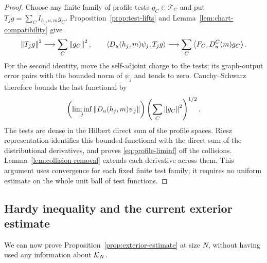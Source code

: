 \begin{proof}
Choose any finite family of profile tests \(g_C\in\mathcal T_C\) and put
\(T_jg=\sum_C I_{h_j,u,m}g_C\). Proposition~\ref{prop:test-lifts} and
Lemma~\ref{lem:chart-compatibility} give
\[
 \left\lVert T_jg\right\rVert^2\longrightarrow\sum_C\left\lVert g_C\right\rVert^2,
 \qquad
 \left\langle D_u(h_j,m)\psi_j,T_jg\right\rangle
 \longrightarrow\sum_C\left\langle F_C,D_u^C(m)g_C\right\rangle.
\]
For the second identity, move the self-adjoint charge to the tests; its
graph-output error pairs with the bounded norm of \(\psi_j\) and tends
to zero. Cauchy--Schwarz therefore bounds the last functional by
\[
 \left(\liminf_j\left\lVert D_u(h_j,m)\psi_j\right\rVert\right)
                 \left(\sum_C\left\lVert g_C\right\rVert^2\right)^{1/2}.
\]
The tests are dense in the Hilbert direct sum of the profile spaces.
Riesz representation identifies this bounded functional with the direct
sum of the distributional derivatives, and proves
\eqref{eq:profile-liminf} off the collisions. Lemma~\ref{lem:collision-removal}
extends each derivative across them. This argument uses convergence for
each fixed finite test family; it requires no uniform estimate on the
whole unit ball of test functions.
\end{proof}

\pagebreak
\subsection{Hardy inequality and the current exterior estimate}

We can now prove Proposition~\ref{prop:exterior-estimate} at size \(N\),
without having used any information about \(\mathcal K_N\).

